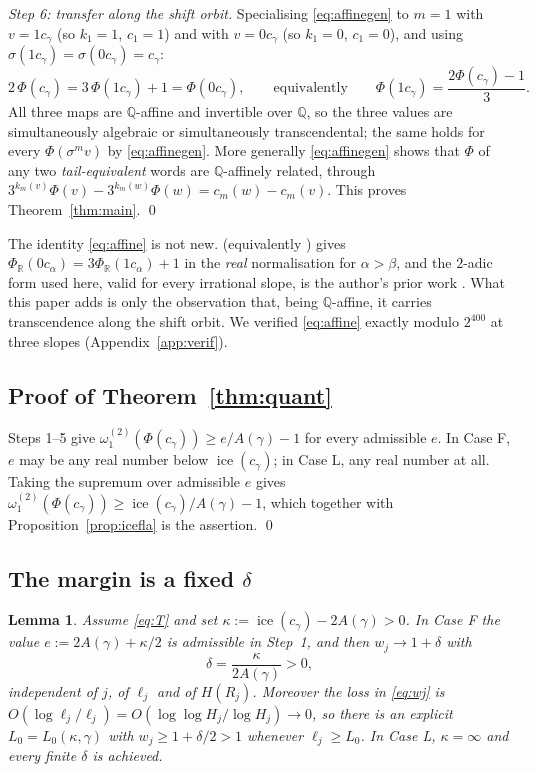\documentclass[11pt,reqno]{amsart}
\theoremstyle{plain}
\newtheorem{lemma}[theorem]{Lemma}
\theoremstyle{definition}
\DeclareMathOperator{\ice}{ice}
\newcommand{\Q}{\mathbb{Q}}
\newcommand{\R}{\mathbb{R}}
\newcommand{\PH}{\Phi}
\newcommand{\Av}{A(\gamma)}
\newcommand{\om}{\omega_1^{(2)}}
\begin{document}
\emph{Step 6: transfer along the shift orbit.} Specialising \eqref{eq:affinegen} to $m=1$ with
$v=1c_\gamma$ (so $k_1=1$, $c_1=1$) and with $v=0c_\gamma$ (so $k_1=0$, $c_1=0$), and using
$\sigma(1c_\gamma)=\sigma(0c_\gamma)=c_\gamma$:
\begin{equation}\label{eq:affine}
  2\,\PH(c_\gamma)=3\,\PH(1c_\gamma)+1=\PH(0c_\gamma),
  \qquad\text{equivalently}\qquad \PH(1c_\gamma)=\frac{2\PH(c_\gamma)-1}{3}.
\end{equation}
All three maps are $\Q$-affine and invertible over $\Q$, so the three values are simultaneously
algebraic or simultaneously transcendental; the same holds for every $\PH(\sigma^{m}v)$ by
\eqref{eq:affinegen}. More generally \eqref{eq:affinegen} shows that $\PH$ of any two
\emph{tail-equivalent} words are $\Q$-affinely related, through
$3^{k_m(v)}\PH(v)-3^{k_m(w)}\PH(w)=c_m(w)-c_m(v)$. This proves Theorem~\ref{thm:main}. \qed

\medskip
The identity \eqref{eq:affine} is not new. \cite[Lemma 37]{LS21} (equivalently
\cite[Lemma 25]{LS21}) gives $\PH_{\R}(0c_\alpha)=3\PH_{\R}(1c_\alpha)+1$ in the \emph{real}
normalisation for $\alpha>\beta$, and the $2$-adic form used here, valid for every irrational
slope, is the author's prior work \cite[Corollaries 7.1 and 8.8]{DJirr}. What this paper adds is
only the observation that, being $\Q$-affine, it carries transcendence along the shift orbit. We verified
\eqref{eq:affine} exactly modulo $2^{400}$ at three slopes (Appendix~\ref{app:verif}).

\subsection{Proof of Theorem~\ref{thm:quant}}
Steps 1--5 give $\om(\PH(c_\gamma))\ge e/\Av-1$ for every admissible $e$. In Case F, $e$ may be any
real number below $\ice(c_\gamma)$; in Case L, any real number at all. Taking the supremum over
admissible $e$ gives $\om(\PH(c_\gamma))\ge\ice(c_\gamma)/\Av-1$, which together with
Proposition~\ref{prop:icefla} is the assertion. \qed

\subsection{The margin is a fixed \texorpdfstring{$\delta$}{delta}}
\begin{lemma}\label{lem:margin}
Assume \eqref{eq:T} and set $\kappa:=\ice(c_\gamma)-2\Av>0$. In Case F the value
$e:=2\Av+\kappa/2$ is admissible in Step~1, and then $w_j\to1+\delta$ with
\[
  \delta=\frac{\kappa}{2\Av}>0,
\]
independent of $j$, of $\ell_j$ and of $H(R_j)$. Moreover the loss in \eqref{eq:wj} is
$O(\log\ell_j/\ell_j)=O(\log\log H_j/\log H_j)\to0$, so there is an explicit
$L_0=L_0(\kappa,\gamma)$ with $w_j\ge1+\delta/2>1$ whenever $\ell_j\ge L_0$. In Case L,
$\kappa=\infty$ and every finite $\delta$ is achieved.
\end{lemma}
\end{document}
